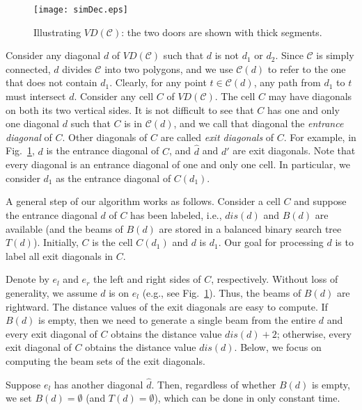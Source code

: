 \documentclass[english,runningheads,11pt]{llncs-revised}
\def\calC{\mathcal{C}}
\def\hatd{\hat{d}}
\newcommand{\vtd}{\mbox{$V\!D$}}
\begin{document}
\begin{figure}[t]
\begin{minipage}[t]{\linewidth}
\begin{center}
\texttt{[image: simDec.eps]}
\caption{\footnotesize Illustrating $\vtd(\calC)$: the two doors are
shown with thick segments.  }
\label{fig:simDec}
\end{center}
\end{minipage}
\vspace{-0.15in}
\end{figure}

Consider any diagonal $d$ of $\vtd(\calC)$ such that $d$ is not $d_1$
or $d_2$. Since $\calC$ is simply connected,
$d$ divides $\calC$ into two polygons, and we use $\calC(d)$ to refer
to the one that does not contain $d_1$. Clearly, for any point $t\in
\calC(d)$, any path from $d_1$ to $t$ must intersect $d$. Consider any
cell $C$ of $\vtd(\calC)$. The cell $C$ may have diagonals on both its
two vertical sides. It is not difficult to see that $C$ has one and only one diagonal $d$
such that $C$ is in $\calC(d)$, and we call that diagonal the {\em
entrance diagonal} of $C$. Other diagonals of $C$ are called {\em
exit diagonals} of $C$.  For example, in Fig.~\ref{fig:simDec}, $d$ is the
entrance diagonal of $C$, and $\hatd$ and $d'$ are exit
diagonals. Note that every diagonal
is an entrance diagonal of one and only one cell. In particular,
we consider $d_1$ as the entrance diagonal of $C(d_1)$.


A general step of our algorithm works as follows. Consider a cell $C$
and suppose the entrance diagonal $d$ of $C$ has been labeled, i.e.,
$dis(d)$ and $B(d)$ are available (and the beams of $B(d)$ are stored
in a balanced binary search tree $T(d)$).
Initially, $C$ is the cell $C(d_1)$ and $d$ is $d_1$.
Our goal for processing $d$ is to label
all exit diagonals in $C$.


Denote by $e_l$ and $e_r$ the
left and right sides of $C$, respectively. Without loss of generality, we assume $d$
is on $e_l$ (e.g., see Fig.~\ref{fig:simDec}).
Thus, the beams of $B(d)$ are rightward.
The distance values of the exit diagonals are easy to compute. If $B(d)$
is empty, then we need to generate a single beam from the entire $d$ and
every exit diagonal of $C$ obtains the distance value $dis(d)+2$; otherwise,
every exit diagonal of $C$ obtains the distance value $dis(d)$.
Below, we focus on computing the beam sets of the exit
diagonals.

Suppose $e_l$ has another diagonal $\hatd$. Then, regardless of
whether $B(d)$ is empty, we set $B(d)=\emptyset$ (and $T(d)=\emptyset$), which
can be done in only constant time.
\end{document}
